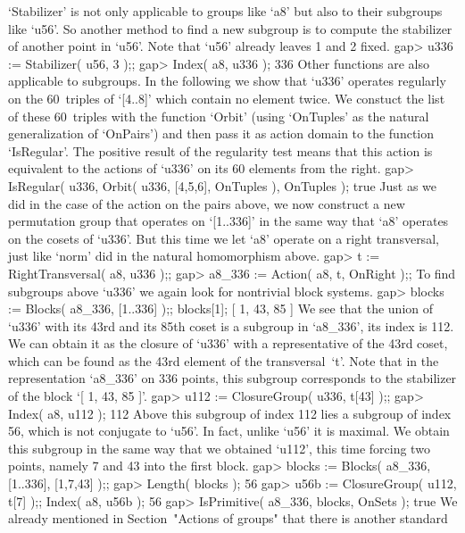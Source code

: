 `Stabilizer' is not only applicable to groups like `a8' but also to their
subgroups like  `u56'. So another  method  to find  a  new subgroup is to
compute the stabilizer of another point in `u56'. Note that `u56' already
leaves 1 and 2 fixed.
\beginexample
gap> u336 := Stabilizer( u56, 3 );;
gap> Index( a8, u336 );
336
\endexample
Other  functions  are also applicable  to  subgroups. In the following we
show that  `u336' operates regularly on the  60~triples of `[4..8]' which
contain no element twice. We  constuct the list  of these 60~triples with
the function `Orbit' (using `OnTuples'  as the natural generalization  of
`OnPairs')  and   then  pass it   as  action domain  to   the function
`IsRegular'.  The positive result of  the regularity test means that this
action is equivalent  to the actions of `u336'  on  its 60 elements
from the right.
\beginexample
gap> IsRegular( u336, Orbit( u336, [4,5,6], OnTuples ), OnTuples );
true
\endexample
Just as we did in the  case of the  action on the  pairs above, we now
construct a new permutation group that operates on `[1..336]' in the same
way that `a8' operates on the cosets of `u336'. But this time we let `a8'
operate  on a right   transversal, just like  `norm'  did in  the natural
homomorphism above.
\beginexample
gap> t := RightTransversal( a8, u336 );;
gap> a8_336 := Action( a8, t, OnRight );;
\endexample
To find  subgroups above `u336' we again look for nontrivial block systems.
\beginexample
gap> blocks := Blocks( a8_336, [1..336] );; blocks[1];
[ 1, 43, 85 ]
\endexample
We see that the union of `u336' with its 43rd and its 85th coset
is a subgroup in `a8_336', its index is 112.
We can obtain it as the closure of `u336' with a representative
of the  43rd coset, which can be found as the 43rd element
of the transversal~`t'.
Note that in the representation `a8_336' on 336 points,
this subgroup corresponds to the stabilizer of the block `[ 1, 43, 85 ]'.
\beginexample
gap> u112 := ClosureGroup( u336, t[43] );;
gap> Index( a8, u112 );
112
\endexample
Above this subgroup of index 112 lies a  subgroup  of index 56, which  is
not conjugate to `u56'.  In fact, unlike `u56' it is  maximal.  We obtain
this subgroup in  the same way that we obtained `u112', this time forcing
two points, namely 7 and 43 into the first block.
\beginexample
gap> blocks := Blocks( a8_336, [1..336], [1,7,43] );;
gap> Length( blocks );
56
gap> u56b := ClosureGroup( u112, t[7] );; Index( a8, u56b );
56
gap> IsPrimitive( a8_336, blocks, OnSets );
true
\endexample
We  already mentioned  in Section~"Actions of groups"
that there is another  standard
